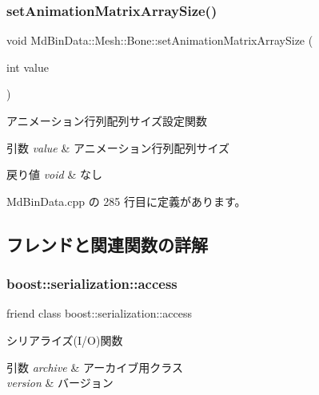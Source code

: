 \subsubsection{\texorpdfstring{set\+Animation\+Matrix\+Array\+Size()}{setAnimationMatrixArraySize()}}
{\footnotesize\ttfamily void Md\+Bin\+Data\+::\+Mesh\+::\+Bone\+::set\+Animation\+Matrix\+Array\+Size (\begin{DoxyParamCaption}\item[{int}]{value }\end{DoxyParamCaption})}



アニメーション行列配列サイズ設定関数 


\begin{DoxyParams}{引数}
{\em value} & アニメーション行列配列サイズ \\
\hline
\end{DoxyParams}

\begin{DoxyRetVals}{戻り値}
{\em void} & なし \\
\hline
\end{DoxyRetVals}


 Md\+Bin\+Data.\+cpp の 285 行目に定義があります。



\subsection{フレンドと関連関数の詳解}
\mbox{\label{class_md_bin_data_1_1_mesh_1_1_bone_ac98d07dd8f7b70e16ccb9a01abf56b9c}} 
\subsubsection{\texorpdfstring{boost\+::serialization\+::access}{boost::serialization::access}}
{\footnotesize\ttfamily friend class boost\+::serialization\+::access\hspace{0.3cm}{\ttfamily [friend]}}



シリアライズ(I/O)関数 


\begin{DoxyParams}{引数}
{\em archive} & アーカイブ用クラス \\
\hline
{\em version} & バージョン \\
\hline
\end{DoxyParams}

